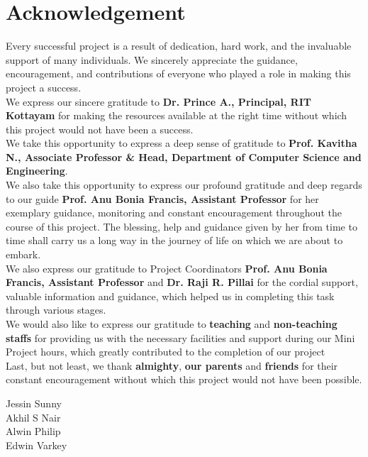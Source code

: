 \newpage
\thispagestyle{empty}
\chapter*{\centering Acknowledgement \centering}
%
Every successful project is a result of dedication, hard work, and the invaluable support of many individuals. We sincerely appreciate the guidance, encouragement, and contributions of everyone who played a role in making this project a success.
\\
 We express our sincere gratitude to \textbf{Dr. Prince A., Principal, RIT Kottayam} for making the resources available at the right time without which this project would not have been a success.
 \\
We take this opportunity to express a deep sense of gratitude to \textbf{Prof. Kavitha N., Associate Professor \& Head, Department of Computer Science and Engineering}.
\\
 We also take this opportunity to express our profound gratitude and deep regards to our guide \textbf{Prof. Anu Bonia Francis, Assistant Professor} for her exemplary guidance, monitoring and constant encouragement throughout the course of this project. The blessing, help and guidance given by her from time to time shall carry us a long way in the journey of life on which we are about to embark.
 \\
 We also express our gratitude to Project Coordinators \textbf{Prof. Anu Bonia Francis, Assistant Professor} and \textbf{Dr. Raji R. Pillai} for the cordial support, valuable information and guidance, which helped us in completing this task through various stages.
 \\
 We would also like to express our gratitude to \textbf{teaching} and \textbf{non-teaching staffs} for providing us with the necessary facilities and support during our Mini Project hours, which greatly contributed to the completion of our project
 \\
 Last, but not least, we thank \textbf{almighty}, \textbf{our parents} and \textbf{friends} for their constant encouragement without which this project would not have been possible.
 \\
\vspace{40pt}
\begin{FlushRight}
Jessin Sunny
\\Akhil S Nair
\\Alwin Philip
\\Edwin Varkey
\end{FlushRight}